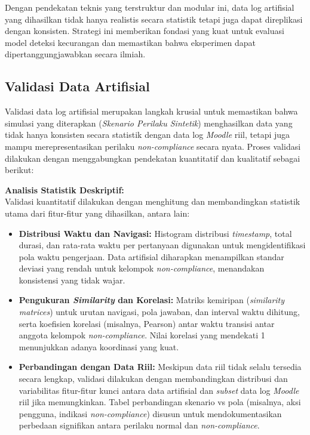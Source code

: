Dengan pendekatan teknis yang terstruktur dan modular ini, data log artifisial yang dihasilkan tidak hanya realistis secara statistik tetapi juga dapat direplikasi dengan konsisten. Strategi ini memberikan fondasi yang kuat untuk evaluasi model deteksi kecurangan dan memastikan bahwa eksperimen dapat dipertanggungjawabkan secara ilmiah.

\subsection{Validasi Data Artifisial}
\label{sec:validasiDataArtifisial}
Validasi data log artifisial merupakan langkah krusial untuk memastikan bahwa simulasi yang diterapkan (\textit{Skenario Perilaku Sintetik}) menghasilkan data yang tidak hanya konsisten secara statistik dengan data log \textit{Moodle} riil, tetapi juga mampu merepresentasikan perilaku \textit{non-compliance} secara nyata. Proses validasi dilakukan dengan menggabungkan pendekatan kuantitatif dan kualitatif sebagai berikut:

\textbf{Analisis Statistik Deskriptif:} \\
Validasi kuantitatif dilakukan dengan menghitung dan membandingkan statistik utama dari fitur-fitur yang dihasilkan, antara lain:
\begin{itemize}
    \item \textbf{Distribusi Waktu dan Navigasi:} Histogram distribusi \textit{timestamp}, total durasi, dan rata-rata waktu per pertanyaan digunakan untuk mengidentifikasi pola waktu pengerjaan. Data artifisial diharapkan menampilkan standar deviasi yang rendah untuk kelompok \textit{non-compliance}, menandakan konsistensi yang tidak wajar.
    \item \textbf{Pengukuran \textit{Similarity} dan Korelasi:} Matriks kemiripan (\textit{similarity matrices}) untuk urutan navigasi, pola jawaban, dan interval waktu dihitung, serta koefisien korelasi (misalnya, Pearson) antar waktu transisi antar anggota kelompok \textit{non-compliance}. Nilai korelasi yang mendekati 1 menunjukkan adanya koordinasi yang kuat.
    \item \textbf{Perbandingan dengan Data Riil:} Meskipun data riil tidak selalu tersedia secara lengkap, validasi dilakukan dengan membandingkan distribusi dan variabilitas fitur-fitur kunci antara data artifisial dan \textit{subset} data log \textit{Moodle} riil jika memungkinkan. Tabel perbandingan skenario vs pola (misalnya, aksi pengguna, indikasi \textit{non-compliance}) disusun untuk mendokumentasikan perbedaan signifikan antara perilaku normal dan \textit{non-compliance}.
\end{itemize}

